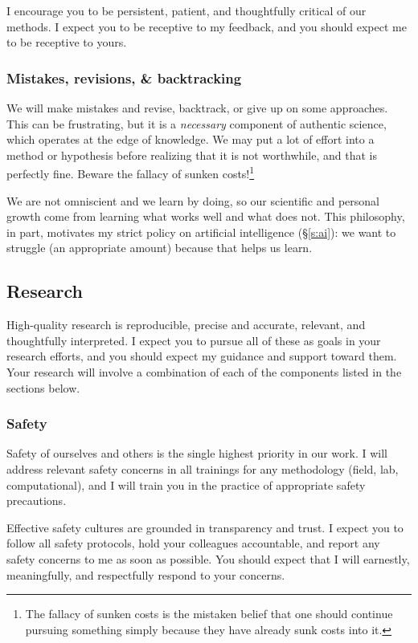I encourage you to be persistent, patient, and thoughtfully critical of our methods.
I expect you to be receptive to my feedback, and you should expect me to be receptive to yours. 

\subsubsection{Mistakes, revisions, \& backtracking}
We will make mistakes and revise, backtrack, or give up on some approaches. 
This can be frustrating, but it is a \emph{necessary} component of authentic science, which operates at the edge of knowledge. 
We may put a lot of effort into a method or hypothesis before realizing that it is not worthwhile, and that is perfectly fine. Beware the fallacy of sunken costs!\footnote{The fallacy of sunken costs is the mistaken belief that one should continue pursuing something simply because they have already sunk costs into it.}

We are not omniscient and we learn by doing, so our scientific and personal growth come from learning what works well and what does not. 
This philosophy, in part, motivates my strict policy on artificial intelligence (\S\ref{s:ai}): we want to struggle (an appropriate amount) because that helps us learn.


\subsection{Research}
High-quality research is reproducible, precise and accurate, relevant, and thoughtfully interpreted. 
I expect you to pursue all of these as goals in your research efforts, and you should expect my guidance and support toward them.
Your research will involve a combination of each of the components listed in the sections below.

\subsubsection{Safety}
Safety of ourselves and others is the single highest priority in our work.
I will address relevant safety concerns in all trainings for any methodology (field, lab, computational), and I will train you in the practice of appropriate safety precautions.

Effective safety cultures are grounded in transparency and trust.
I expect you to follow all safety protocols, hold your colleagues accountable, and report any safety concerns to me as soon as possible. 
You should expect that I will earnestly, meaningfully, and respectfully respond to your concerns.

